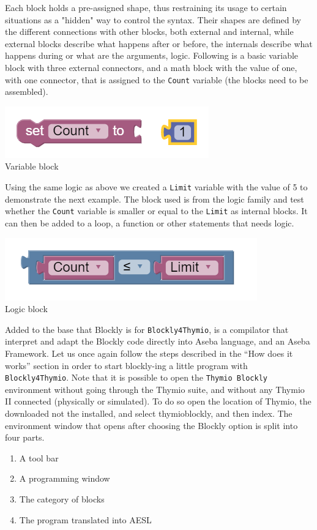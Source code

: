\documentclass{scrartcl}
\begin{document}
Each block holds a pre-assigned shape, thus restraining its usage to certain situations as a "hidden" way to control the syntax. Their shapes are defined by the different connections with other blocks, 
both external and internal, while external blocks describe what happens after or before, the internals describe what happens during or what are the arguments, logic. 
Following is a basic variable block with three external connectors, and a math block with the value of one, with one connector, that is assigned to the \texttt{Count} variable (the blocks need to be assembled). \\
\begin{center}
  \includegraphics[scale=0.5]{./Blockly/basic_variable}\\
  Variable block
\end{center}

Using the same logic as above we created a \texttt{Limit} variable with the value of 5 to demonstrate the next example. 
The block used is from the logic family and test whether the \texttt{Count} variable is smaller or equal to the \texttt{Limit} as internal blocks. 
It can then be added to a loop, a function or other statements that needs logic.\\
\begin{center}
  \includegraphics[scale=0.5]{./Blockly/basic_logic}\\
  Logic block
\end{center}

Added to the base that Blockly is for \texttt{Blockly4Thymio}, is a compilator that interpret and adapt the Blockly code directly into Aseba language, and an Aseba Framework. 
Let us once again follow the steps described in the “How does it works” section in order to start blockly-ing a little program with \texttt{Blockly4Thymio}. 
Note that it is possible to open the \texttt{Thymio Blockly} environment without going through the Thymio suite, and without any Thymio II connected (physically or simulated). 
To do so open the location of Thymio, the downloaded not the installed, and select thymio\textunderscore blockly, and then index.
The environment window that opens after choosing the Blockly option is split into four parts.
\begin{enumerate}
  \item A tool bar
  \item A programming window
  \item The category of blocks
  \item The program translated into AESL
\end{enumerate}
\end{document}
